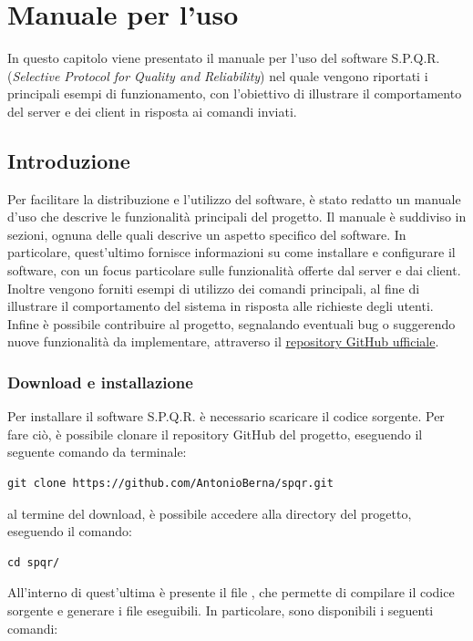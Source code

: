 \chapter{Manuale per l'uso }

In questo capitolo viene presentato il manuale per l'uso del software S.P.Q.R. (\textit{Selective Protocol for Quality and Reliability}) nel quale vengono riportati i principali esempi di funzionamento, con l'obiettivo di illustrare il comportamento del server e dei client in risposta ai comandi inviati.

\section{Introduzione}
Per facilitare la distribuzione e l'utilizzo del software, è stato redatto un manuale d'uso che descrive le funzionalità principali del progetto.
Il manuale è suddiviso in sezioni, ognuna delle quali descrive un aspetto specifico del software.
In particolare, quest'ultimo fornisce informazioni su come installare e configurare il software, con un focus particolare sulle funzionalità offerte dal server e dai client.
Inoltre vengono forniti esempi di utilizzo dei comandi principali, al fine di illustrare il comportamento del sistema in risposta alle richieste degli utenti.
Infine è possibile contribuire al progetto, segnalando eventuali bug o suggerendo nuove funzionalità da implementare, attraverso il \href{https://github.com/AntonioBerna/spqr}{repository GitHub ufficiale}.

\subsection{Download e installazione}
Per installare il software S.P.Q.R. è necessario scaricare il codice sorgente.
Per fare ciò, è possibile clonare il repository GitHub del progetto, eseguendo il seguente comando da terminale:

\begin{lstlisting}[numbers=none]
git clone https://github.com/AntonioBerna/spqr.git
\end{lstlisting}

al termine del download, è possibile accedere alla directory del progetto, eseguendo il comando:

\begin{lstlisting}[numbers=none]
cd spqr/
\end{lstlisting}

All'interno di quest'ultima è presente il file , che permette di compilare il codice sorgente e generare i file eseguibili.
In particolare, sono disponibili i seguenti comandi:

